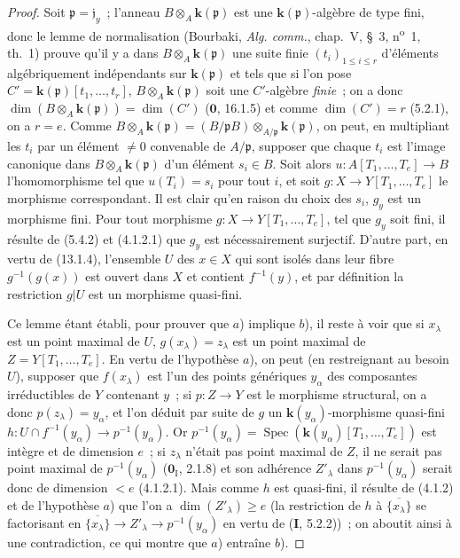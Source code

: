 \begin{proof}
Soit $\mathfrak p=\mathfrak j_y$~; l'anneau $B\otimes_A\boldsymbol{k}(\mathfrak p)$ est une
$\boldsymbol{k}(\mathfrak p)$-algèbre de type fini, donc le lemme de normalisation
(Bourbaki, \emph{Alg. comm.}, chap.~V, \S~3, n\textsuperscript{o}~1, th.~1)
prouve qu'il y a dans $B\otimes_A\boldsymbol{k}(\mathfrak p)$ une suite finie
$(t_i)_{1\leq i\leq r}$ d'éléments algébriquement indépendants sur
$\boldsymbol{k}(\mathfrak p)$ et tels que si l'on pose
$C'=\boldsymbol{k}(\mathfrak p)[t_1,\ldots,t_r]$, $B\otimes_A\boldsymbol{k}(\mathfrak p)$ soit une
$C'$-algèbre \emph{finie}~; on a donc
$\dim(B\otimes_A\boldsymbol{k}(\mathfrak p))=\dim(C')$ ($\mathbf 0$, 16.1.5) et comme
$\dim(C')=r$ (5.2.1), on a $r=e$. Comme
$B\otimes_A\boldsymbol{k}(\mathfrak p)=(B/\mathfrak pB)\otimes_{A/\mathfrak p}\boldsymbol{k}(\mathfrak p)$,
on peut, en multipliant les $t_i$ par un élément $\neq0$
convenable de $A/\mathfrak p$, supposer que chaque $t_i$ est l'image canonique
dans $B\otimes_A\boldsymbol{k}(\mathfrak p)$ d'un élément $s_i\in B$. Soit alors
$u:A[T_1,\ldots,T_e]\to B$ l'homomorphisme tel que $u(T_i)=s_i$ pour tout
$i$, et soit $g:X\to Y[T_1,\ldots,T_e]$ le morphisme correspondant. Il est
clair qu'en raison du choix des $s_i$, $g_y$ est un morphisme fini. Pour tout
morphisme $g:X\to Y[T_1,\ldots,T_e]$, tel que $g_y$ soit fini, il résulte de
(5.4.2) et (4.1.2.1) que $g_y$ est nécessairement surjectif. D'autre part, en
vertu de (13.1.4), l'ensemble $U$ des $x\in X$ qui sont isolés dans leur fibre
$g^{-1}(g(x))$ est ouvert dans $X$ et contient $f^{-1}(y)$, et par définition
la restriction $g|U$ est un morphisme quasi-fini.

Ce lemme étant établi, pour prouver que $a$) implique $b$), il reste à voir
que si $x_\lambda$ est un point maximal de $U$, $g(x_\lambda)=z_\lambda$ est
un point maximal de $Z=Y[T_1,\ldots,T_e]$. En vertu de l'hypothèse $a$), on
peut (en restreignant au besoin $U$), supposer que $f(x_\lambda)$ est l'un des
points génériques $y_\alpha$ des composantes irréductibles de $Y$ contenant
$y$~; si $p:Z\to Y$ est le morphisme structural, on a donc
$p(z_\lambda)=y_\alpha$, et l'on déduit par suite de $g$ un
$\boldsymbol{k}(y_\alpha)$-morphisme quasi-fini
$h:U\cap f^{-1}(y_\alpha)\longrightarrow p^{-1}(y_\alpha)$.
Or $p^{-1}(y_\alpha)=\operatorname{Spec}(\boldsymbol{k}(y_\alpha)[T_1,\ldots,T_e])$ est
intègre et de dimension $e$~; si $z_\lambda$ n'était pas point maximal de
$Z$, il ne serait pas point maximal de $p^{-1}(y_\alpha)$
($\mathbf 0_{\mathrm I}$, 2.1.8) et son adhérence $Z'_\lambda$ dans
$p^{-1}(y_\alpha)$ serait donc de dimension $<e$ (4.1.2.1). Mais comme $h$
est quasi-fini, il résulte de (4.1.2) et de l'hypothèse $a$) que l'on a
$\dim(Z'_\lambda)\geq e$ (la restriction de $h$ à
$\overline{\{x_\lambda\}}$ se factorisant en
$\overline{\{x_\lambda\}}\longrightarrow Z'_\lambda
  \longrightarrow p^{-1}(y_\alpha)$
en vertu de (\textbf{I}, 5.2.2))~; on aboutit ainsi à une contradiction, ce
qui montre que $a$) entraîne $b$).


\end{proof}
